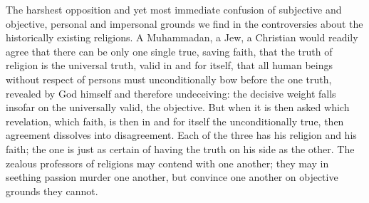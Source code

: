 \documentclass[12pt,a4paper,openany]{book}
\newcommand{\opage}[1]{\marginnote{\footnotesize\textit{[#1]}}}
\begin{document}
The harshest opposition and yet most immediate
confusion of subjective and objective, personal and
\setcounter{footnote}{0}%
\opage{603}impersonal grounds we find in the controversies about the historically
existing religions. A Muhammadan, a Jew,
a Christian would readily agree that there can be only
one single true, saving faith, that the truth of religion
is the universal truth, valid in and for itself, that
all human beings without respect of persons must unconditionally
bow before the one truth, revealed by God himself and therefore
undeceiving: the decisive weight falls
insofar on the universally valid, the objective. But
when it is then asked which revelation, which faith,
is then in and for itself the unconditionally true, then
agreement dissolves into disagreement. Each of the three has his
religion and his faith; the one is just as certain
of having the truth on his side as the other. The
zealous professors of religions may contend with one another;
they may in seething passion murder one another,
but convince one another on objective grounds they
cannot.
\end{document}
